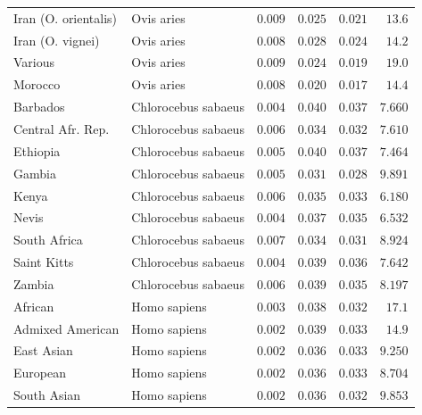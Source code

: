 \documentclass{article}
\begin{document}
\begin{center}
\begin{longtable}{|l|l|r|r|r|r|}
            Iran (O. orientalis) & Ovis aries          & $ 0.009$              & $ 0.025$ & $ 0.021$                    & $  13.6$   \\
            Iran (O. vignei)     & Ovis aries          & $ 0.008$              & $ 0.028$ & $ 0.024$                    & $  14.2$   \\
            Various              & Ovis aries          & $ 0.009$              & $ 0.024$ & $ 0.019$                    & $  19.0$   \\
            Morocco              & Ovis aries          & $ 0.008$              & $ 0.020$ & $ 0.017$                    & $  14.4$   \\
            Barbados             & Chlorocebus sabaeus & $ 0.004$              & $ 0.040$ & $ 0.037$                    & $ 7.660$ \\
            Central Afr. Rep.    & Chlorocebus sabaeus & $ 0.006$              & $ 0.034$ & $ 0.032$                    & $ 7.610$ \\
            Ethiopia             & Chlorocebus sabaeus & $ 0.005$              & $ 0.040$ & $ 0.037$                    & $ 7.464$ \\
            Gambia               & Chlorocebus sabaeus & $ 0.005$              & $ 0.031$ & $ 0.028$                    & $ 9.891$ \\
            Kenya                & Chlorocebus sabaeus & $ 0.006$              & $ 0.035$ & $ 0.033$                    & $ 6.180$ \\
            Nevis                & Chlorocebus sabaeus & $ 0.004$              & $ 0.037$ & $ 0.035$                    & $ 6.532$ \\
            South Africa         & Chlorocebus sabaeus & $ 0.007$              & $ 0.034$ & $ 0.031$                    & $ 8.924$ \\
            Saint Kitts          & Chlorocebus sabaeus & $ 0.004$              & $ 0.039$ & $ 0.036$                    & $ 7.642$ \\
            Zambia               & Chlorocebus sabaeus & $ 0.006$              & $ 0.039$ & $ 0.035$                    & $ 8.197$ \\
            African              & Homo sapiens        & $ 0.003$              & $ 0.038$ & $ 0.032$                    & $  17.1$   \\
            Admixed American     & Homo sapiens        & $ 0.002$              & $ 0.039$ & $ 0.033$                    & $  14.9$   \\
            East Asian           & Homo sapiens        & $ 0.002$              & $ 0.036$ & $ 0.033$                    & $ 9.250$ \\
            European             & Homo sapiens        & $ 0.002$              & $ 0.036$ & $ 0.033$                    & $ 8.704$ \\
            South Asian          & Homo sapiens        & $ 0.002$              & $ 0.036$ & $ 0.032$                    & $ 9.853$ \\
        \end{longtable}

    \end{center}
\end{document}
